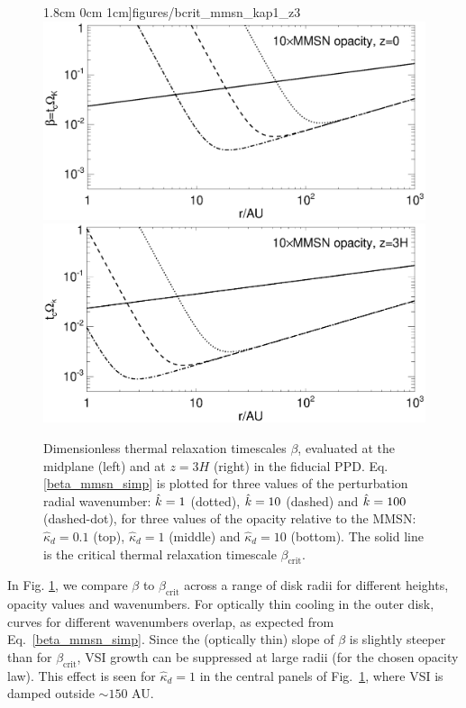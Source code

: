\begin{figure}
  1.8cm 0cm 1cm]{figures/bcrit_mmsn_kap1_z3}\\
  \includegraphics[scale=.47,clip=true,trim=0cm 0cm 0cm
  1cm]{figures/bcrit_mmsn_kap10_z0}\includegraphics[scale=.47,clip=true,trim=2.5cm 0cm 0cm
  1cm]{figures/bcrit_mmsn_kap10_z3} 
  \caption{Dimensionless thermal relaxation timescales $\beta$,
    evaluated at the midplane (left) and at $z=3H$ (right) in the
    fiducial PPD. Eq. \ref{beta_mmsn_simp} is plotted  
    for three values of the 
    perturbation radial wavenumber: $\hat{k}=1$ (dotted), $\hat{k}=10$
    (dashed) and $\hat{k}=100$ (dashed-dot), for three values of the
    opacity relative to the MMSN: $\hat{\kappa}_d=0.1$ (top),
    $\hat{\kappa}_d=1$ (middle) and $\hat{\kappa}_d=10$ (bottom).  
    The solid line is the 
    critical thermal relaxation timescale $\beta_\mathrm{crit}$.  
    \label{mmsn_bcrit_bcool}}   
\end{figure}  

In Fig. \ref{mmsn_bcrit_bcool}, we compare $\beta$ to
$\beta_\mathrm{crit}$ across a range of disk radii for different heights, opacity values and wavenumbers.
For optically thin cooling in the outer disk, curves for different wavenumbers overlap, as expected from Eq.\ \ref{beta_mmsn_simp}.
Since the (optically thin) slope of $\beta$ is slightly steeper than for $\beta_\mathrm{crit}$, VSI growth can be suppressed at large radii (for the chosen opacity law).  This effect is seen for $\hat{\kappa}_d = 1$ in the central panels of Fig.\ \ref{mmsn_bcrit_bcool}, where VSI is damped outside $\sim 150$ AU.

